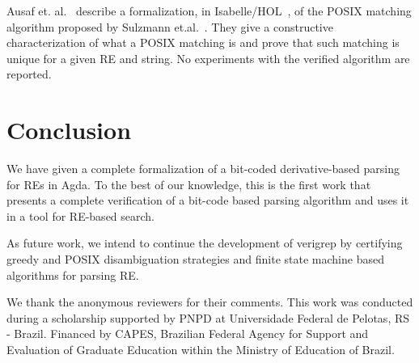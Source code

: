\documentclass[sigconf]{acmart}
\theoremstyle{definition}
\begin{document}
Ausaf et. al.~\cite{AusafDU16} describe a formalization, in
Isabelle/HOL~\cite{Nipkow02}, of the POSIX matching algorithm proposed
by Sulzmann et.al.~\cite{SulzmannL14}. They give a constructive
characterization of what a POSIX matching is and prove that such
matching is unique for a given RE and string. No experiments with the
verified algorithm are reported.


\section{Conclusion}\label{sec:conclusion}

We have given a complete formalization of a bit-coded derivative-based 
parsing for REs in Agda. To the best of our knowledge, this is the first work
that presents a complete verification of a bit-code based parsing algorithm 
and uses it in a tool for RE-based search.


As future work, we intend to continue the development of verigrep by
certifying greedy and POSIX disambiguation strategies and finite state machine
based algorithms for parsing RE.

\begin{acks}
We thank the anonymous reviewers for their comments. 
This work was conducted during a scholarship supported by PNPD at 
Universidade Federal de Pelotas, RS - Brazil. Financed by CAPES, Brazilian 
Federal Agency for Support and Evaluation of Graduate Education within the 
Ministry of Education of Brazil.
\end{acks}



\end{document}
